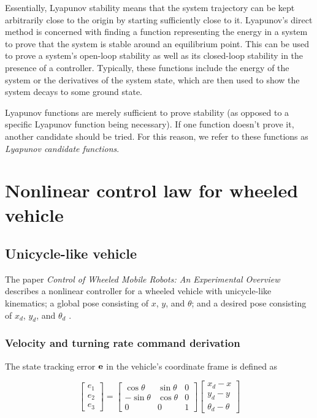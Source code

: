 Essentially, Lyapunov stability means that the \gls{system} trajectory can be
kept arbitrarily close to the origin by starting sufficiently close to it.
Lyapunov's direct method is concerned with finding a function representing the
energy in a \gls{system} to prove that the \gls{system} is stable around an
equilibrium point. This can be used to prove a \gls{system}'s open-loop
stability as well as its closed-loop stability in the presence of a controller.
Typically, these functions include the energy of the \gls{system} or the
derivatives of the \gls{system} \gls{state}, which are then used to show the
\gls{system} decays to some ground state.

Lyapunov functions are merely sufficient to prove stability (as opposed to a
specific Lyapunov function being necessary). If one function doesn't prove it,
another candidate should be tried. For this reason, we refer to these functions
as \textit{Lyapunov candidate functions}.

\section{Nonlinear control law for wheeled vehicle}

\subsection{Unicycle-like vehicle}

The paper \textit{Control of Wheeled Mobile Robots: An Experimental Overview}
describes a nonlinear controller for a wheeled vehicle with unicycle-like
kinematics; a global \gls{pose} consisting of $x$, $y$, and $\theta$; and a
desired \gls{pose} consisting of $x_d$, $y_d$, and $\theta_d$
\cite{bib:ctrl_wheeled_mobile_robots}.

\subsubsection{Velocity and turning rate command derivation}

The \gls{state} tracking \gls{error} $\mathbf{e}$ in the vehicle's coordinate frame
is defined as

\begin{equation*}
  \begin{bmatrix}
    e_1 \\
    e_2 \\
    e_3
  \end{bmatrix} =
  \begin{bmatrix}
    \cos\theta & \sin\theta & 0 \\
    -\sin\theta & \cos\theta & 0 \\
    0 & 0 & 1
  \end{bmatrix}
  \begin{bmatrix}
    x_d - x \\
    y_d - y \\
    \theta_d - \theta
  \end{bmatrix}
\end{equation*}

